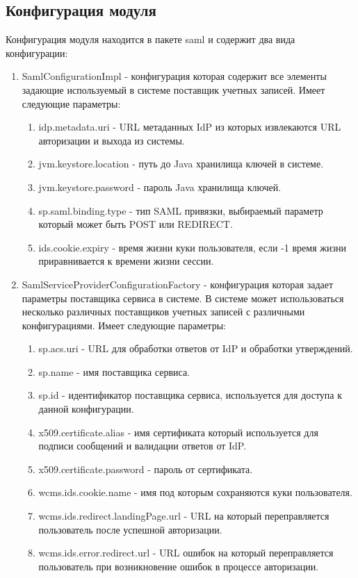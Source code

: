 \subsection{Конфигурация модуля}
Конфигурация модуля находится в пакете saml и содержит два вида конфигурации:
\begin{enumerate}
\item SamlConfigurationImpl - конфигурация которая содержит все элементы задающие используемый в системе поставщик учетных записей. Имеет следующие параметры:
\begin{enumerate}
\item idp.metadata.uri - URL метаданных IdP из которых извлекаются URL авторизации и выхода из системы.
\item jvm.keystore.location - путь до Java хранилища ключей в системе.
\item jvm.keystore.password - пароль Java хранилища ключей.
\item sp.saml.binding.type - тип SAML привязки, выбираемый параметр который может быть POST или REDIRECT.
\item ids.cookie.expiry - время жизни куки пользователя, если -1 время жизни приравнивается к времени жизни сессии.
\end{enumerate}
\item SamlServiceProviderConfigurationFactory - конфигурация которая задает параметры поставщика сервиса в системе. В системе может использоваться несколько различных поставщиков учетных записей с различными конфигурациями. Имеет следующие параметры:
\begin{enumerate}
\item sp.acs.uri - URL для обработки ответов от IdP и обработки утверждений.
\item sp.name - имя поставщика сервиса.
\item sp.id - идентификатор поставщика сервиса, используется для доступа к данной конфигурации.
\item x509.certificate.alias - имя сертификата который используется для подписи сообщений и валидации ответов от IdP.
\item x509.certificate.password - пароль от сертификата.
\item wcms.ids.cookie.name - имя под которым сохраняются куки пользователя.
\item wcms.ids.redirect.landingPage.url - URL на который переправляется пользователь после успешной авторизации.
\item wcms.ids.error.redirect.url - URL ошибок на который переправляется пользователь при возникновение ошибок в процессе авторизации.

\end{enumerate}
\end{enumerate}
